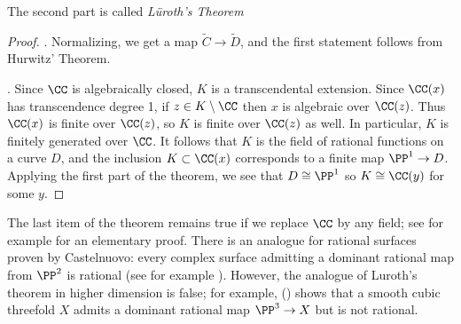 The second part is called \emph{L\"uroth's Theorem}
 
\begin{proof}
. Normalizing, we get a map  $ \tilde C \to \tilde D$, and the first statement follows from Hurwitz' Theorem.

\medbreak

. Since $\CC$ is algebraically closed, $K$ is a transcendental extension. Since $\CC(x)$ has
transcendence degree 1, if $z\in K\setminus \CC$
then $x$ is algebraic over $\CC(z)$. Thus $\CC(x)$ is finite over $\CC(z)$, so $K$ is finite over $\CC(z)$
as well. In particular, $K$ is finitely generated over $\CC$. It follows that $K$ is the field of rational functions
on a curve $D$, and the inclusion $K\subset \CC(x)$ corresponds to a finite map $\PP^1\to D$. Applying
the first part of the theorem, we see that $D\cong \PP^1$ so $K \cong \CC(y)$ for some $y$.
\end{proof}
 
\begin{fact}
The last item of the theorem remains true if we replace $\CC$ by any  field; see for example \cite[Section 8.13]{JacobsonII} for an elementary proof.
There is an analogue for rational surfaces proven by Castelnuovo: every complex surface admitting a dominant rational
map from $\PP^2$ is rational (see for example \cite[Corollary V.5]{Beauville}). However, the analogue of Luroth's theorem in higher dimension is false; for example, (\cite{MR0302652}) shows that a smooth cubic threefold $X$ admits a dominant rational map $\PP^3 \to X$ but is not rational.
\end{fact}

